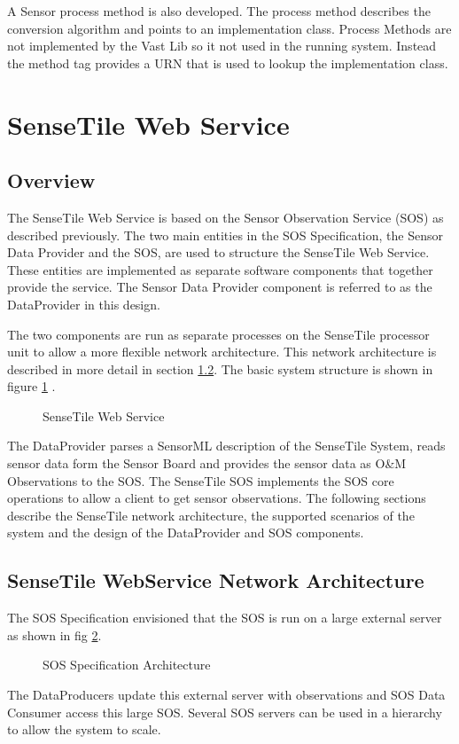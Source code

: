 \documentclass[]{final_report}
\begin{document}
A Sensor process method is also developed. The process method describes the conversion algorithm and points to an implementation class. Process Methods are not implemented by the Vast Lib so it not used in the running system. Instead the method tag provides a URN that is used to lookup the implementation class.

\section{SenseTile Web Service}
\subsection{Overview}

The SenseTile Web Service is based on the Sensor Observation Service (SOS) as described previously. The two main entities in the SOS Specification, the Sensor Data Provider and the SOS,  are used to structure the SenseTile Web Service. These entities are implemented as separate software components that together provide the service. The Sensor Data Provider component is referred to as the DataProvider in this design.

The two components are run as separate processes on the SenseTile processor unit to allow a more flexible network architecture.  This network architecture is described in more detail in section \ref{subsec:SenseTile WebService Network Architecture}. The basic system structure is shown in figure \ref {fig:Deployment_sensetile} .

\begin{figure}[h]
\centering
{}
\caption{SenseTile Web Service}\label{fig:Deployment_sensetile}
\end{figure}

The DataProvider parses a SensorML description of the SenseTile System, reads sensor data form the Sensor Board and provides the sensor data as O\&M Observations to the SOS. The SenseTile SOS implements the SOS core operations to allow a client to get sensor observations. The following sections describe the SenseTile network architecture, the supported scenarios of the system and the design of the DataProvider and SOS components.

\subsection{SenseTile WebService Network Architecture}
\label{subsec:SenseTile WebService Network Architecture}
The SOS Specification envisioned that the SOS is run on a large external server as shown in fig \ref{fig:Deployment_ext_sos}. 
\begin{figure}[h]
\centering
{}
\caption{SOS Specification Architecture}\label{fig:Deployment_ext_sos}
\end{figure}
\newline
The DataProducers update this external server with observations and SOS Data Consumer access this large SOS. Several SOS servers can be used in a hierarchy to allow the system to scale.
\end{document}
